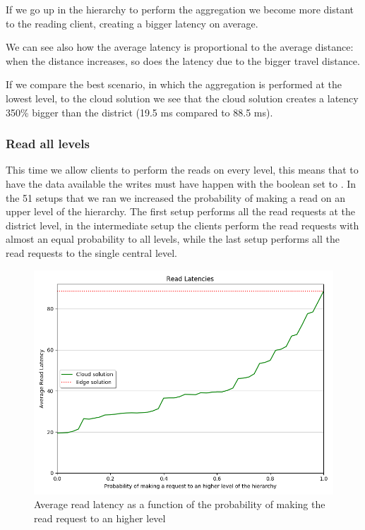 If we go up in the hierarchy to perform the aggregation we become more distant to the reading client, creating a bigger latency on average.

We can see also how the average latency is proportional to the average distance: when the distance increases, so does the latency due to the bigger travel distance.

If we compare the best scenario, in which the aggregation is performed at the lowest level, to the cloud solution we see that the cloud solution creates a latency 350\% bigger than the district (19.5 ms compared to 88.5 ms). 


\subsubsection{Read all levels}
This time we allow clients to perform the reads on every level, this means that to have the data available the writes must have happen with the  boolean set to .
In the 51 setups that we ran we increased the probability of making a read on an upper level of the hierarchy. The first setup performs all the read requests at the district level, in the intermediate setup the clients perform the read requests with almost an equal probability to all levels, while the last setup performs all the read requests to the single central level.

\begin{figure}[H]
    \centering
    \includegraphics[width=0.95\linewidth]{Figures/Evaluation/read-all-latency.png}
    \caption{Average read latency as a function of the probability of making the read request to an higher level}
    \label{fig:/read-all-latency}
\end{figure}

